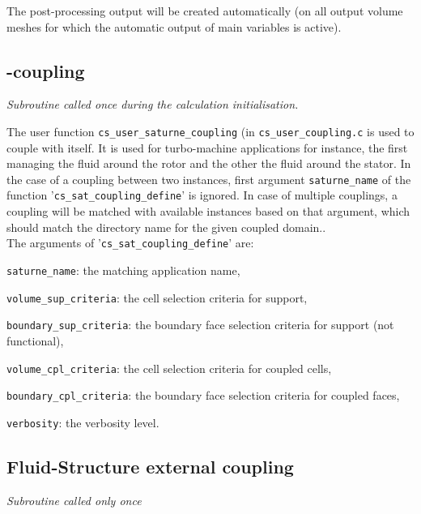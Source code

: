 {{{The post-processing output will be created automatically (on all output volume
meshes for which the automatic output of main variables is active).

\subsection{\CS-\CS coupling}

\noindent
\textit{Subroutine called once during the calculation initialisation.}

The user function \texttt{cs\_user\_saturne\_coupling} (in
 \texttt{cs\_user\_coupling.c} is used to couple \CS with itself.
 It is used for turbo-machine applications for instance, the first \CS managing
 the fluid around the rotor and the other the fluid around the stator.
In the case of a coupling between two \CS instances, first argument \texttt{saturne\_name}
 of the function '\texttt{cs\_sat\_coupling\_define}' is ignored.
 In case of multiple couplings, a coupling will be matched with available \CS
 instances based on that argument, which should match the directory name for the
 given coupled domain..\\
The arguments of '\texttt{cs\_sat\_coupling\_define}' are:
\begin{list}{-}{}
\item \texttt{saturne\_name}: the matching \CS application name,
\item \texttt{volume\_sup\_criteria}: the cell selection criteria for support,
\item \texttt{boundary\_sup\_criteria}: the boundary face selection criteria for support (not functional),
\item \texttt{volume\_cpl\_criteria}: the cell selection criteria for coupled cells,
\item \texttt{boundary\_cpl\_criteria}: the boundary face selection criteria for coupled faces,
\item \texttt{verbosity}: the verbosity level.
\end{list}


\subsection{Fluid-Structure external coupling}

\noindent
\textit{Subroutine called only once}

}}}
